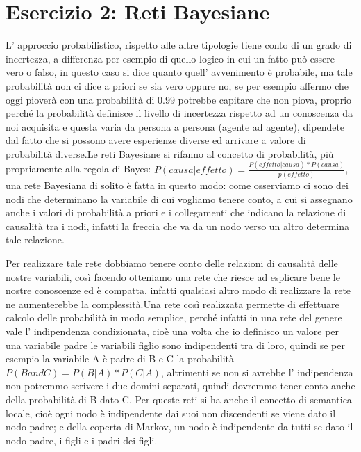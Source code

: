 		\section{Esercizio 2: Reti Bayesiane}
		\label{sec:es2}
		L' approccio probabilistico, rispetto alle altre tipologie tiene conto di un grado di incertezza, a differenza per esempio di quello logico in cui un fatto può essere vero o falso, in questo caso si dice quanto quell' avvenimento è probabile, ma tale probabilità non ci dice a priori se sia vero oppure no, se per esempio affermo che oggi pioverà con una probabilità di 0.99 potrebbe capitare che non piova, proprio perché la probabilità definisce il livello di incertezza rispetto ad un conoscenza da noi acquisita e questa varia da persona a persona (agente ad agente), dipendete dal fatto che si possono avere esperienze diverse ed arrivare a valore di probabilità diverse.Le reti Bayesiane si rifanno al concetto di probabilità, più propriamente alla regola di Bayes: $P(causa|effetto)=\frac{P(effetto|causa)*P(causa)}{p(effetto)}$, una rete Bayesiana di solito è fatta in questo modo:
		come osserviamo ci sono dei nodi che determinano la variabile di cui vogliamo tenere conto, a cui si assegnano anche i valori di probabilità a priori e i collegamenti che indicano la relazione di causalità tra i nodi, infatti la freccia che va da un nodo verso un altro determina tale relazione.
		\par 
		Per realizzare tale rete dobbiamo tenere conto delle relazioni di causalità delle nostre variabili, così facendo otteniamo una rete che riesce ad esplicare bene le nostre conoscenze ed è compatta, infatti qualsiasi altro modo di realizzare la rete ne aumenterebbe la complessità.Una rete così realizzata permette di effettuare calcolo delle probabilità in modo semplice, perché infatti in una rete del genere vale l' indipendenza condizionata, cioè una volta che io definisco un valore per una variabile padre le variabili figlio sono indipendenti tra di loro, quindi se per esempio la variabile A è padre di B e C la probabilità $P(B and C)=P(B|A)*P(C|A)$, altrimenti se non si avrebbe l' indipendenza non potremmo scrivere i due domini separati, quindi dovremmo tener conto anche della probabilità di B dato C. Per queste reti si ha anche il concetto di semantica locale, cioè ogni nodo è indipendente dai suoi non discendenti se viene dato il nodo padre; e della coperta di Markov, un nodo è indipendente da tutti se dato il nodo padre, i figli e i padri dei figli.
		\par  

